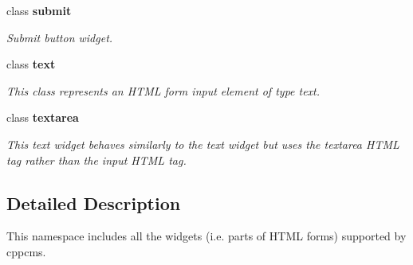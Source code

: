 \begin{DoxyCompactItemize}
class {\bf submit}
\begin{DoxyCompactList}\small\item\em Submit button widget. \end{DoxyCompactList}\item 
class {\bf text}
\begin{DoxyCompactList}\small\item\em This class represents an H\+T\+ML form input element of type text. \end{DoxyCompactList}\item 
class {\bf textarea}
\begin{DoxyCompactList}\small\item\em This text widget behaves similarly to the text widget but uses the {\ttfamily textarea} H\+T\+ML tag rather than the {\ttfamily input} H\+T\+ML tag. \end{DoxyCompactList}\end{DoxyCompactItemize}


\subsection{Detailed Description}
This namespace includes all the widgets (i.\+e. parts of H\+T\+ML forms) supported by cppcms. 